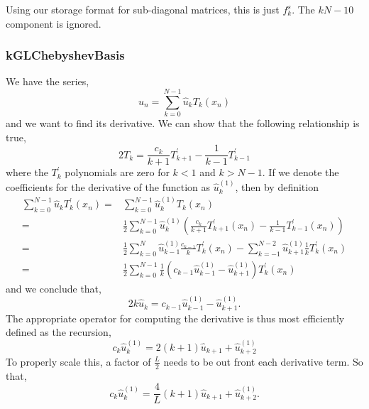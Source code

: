 \documentclass[11pt]{article}
\begin{document}
Using our storage format for sub-diagonal matrices, this is just $f^s_k$. The $kN-10$ component is ignored.

\subsubsection{kGLChebyshevBasis}

We have the series,
\begin{equation}
u_n=\sum_{k=0}^{N-1} \hat{u}_k T_k(x_n)
\end{equation}
and we want to find its derivative. We can show that the following relationship is true,
\begin{equation}
2 T_k = \frac{c_k}{k+1} T_{k+1}^\prime - \frac{1}{k-1} T_{k-1}^\prime
\end{equation}
where the $T_k^\prime$ polynomials are zero for $k<1$ and $k>N-1$. If we denote the coefficients for the derivative of the function as $\hat{u}_k^{(1)}$, then by definition
\begin{align}
 \sum_{k=0}^{N-1} \hat{u}_kT_k^\prime(x_n) =& \sum_{k=0}^{N-1} \hat{u}_k^{(1)} T_k(x_n) \\
 =& \frac{1}{2} \sum_{k=0}^{N-1} \hat{u}_k^{(1)} \left(\frac{c_k}{k+1} T_{k+1}^\prime(x_n) - \frac{1}{k-1} T_{k-1}^\prime(x_n) \right) \\
 =& \frac{1}{2} \sum_{k=0}^{N} \hat{u}_{k-1}^{(1)} \frac{c_{k-1}}{k} T_{k}^\prime(x_n) -  \sum_{k=-1}^{N-2} \hat{u}_{k+1}^{(1)} \frac{1}{k} T_{k}^\prime(x_n) \\
 =& \frac{1}{2} \sum_{k=0}^{N-1} \frac{1}{k} \left( c_{k-1} \hat{u}_{k-1}^{(1)} -  \hat{u}_{k+1}^{(1)} \right) T_{k}^\prime(x_n) 
\end{align}
and we conclude that,
\begin{equation}
2 k \hat{u}_k = c_{k-1} \hat{u}_{k-1}^{(1)} -  \hat{u}_{k+1}^{(1)}.
\end{equation}
The appropriate operator for computing the derivative is thus most efficiently defined as the recursion,
\begin{equation}
c_{k} \hat{u}_{k}^{(1)} = 2 (k+1) \hat{u}_{k+1} + \hat{u}_{k+2}^{(1)}
\end{equation}
To properly scale this, a factor of $\frac{L}{2}$ needs to be out front each derivative term. So that,
\begin{equation}
c_{k} \hat{u}_{k}^{(1)} = \frac{4}{L} (k+1) \hat{u}_{k+1} + \hat{u}_{k+2}^{(1)}.
\end{equation}
\end{document}
